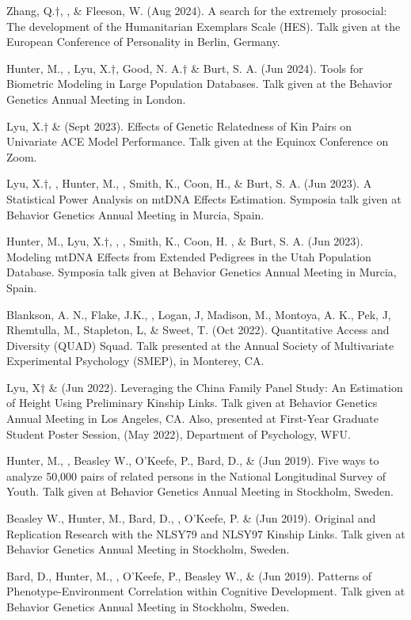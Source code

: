 \begin{etaremune}
\item Zhang, Q.$\dagger$, \meb, \&  Fleeson, W. (Aug 2024). A search for the extremely prosocial: The development of the Humanitarian Exemplars Scale (HES). Talk given at the European Conference of Personality in Berlin, Germany.
\item Hunter, M., \meb, Lyu, X.$\dagger$, Good, N. A.$\dagger$ \& Burt, S. A. (Jun 2024). Tools for Biometric Modeling in Large Population Databases. Talk given at the Behavior Genetics Annual Meeting in London.
\item Lyu, X.$\dagger$ \& \meb (Sept 2023). Effects of Genetic Relatedness of Kin Pairs on Univariate ACE Model Performance. Talk given at the Equinox Conference on Zoom.
\item Lyu, X.$\dagger$, \meb, Hunter, M.,  \Joe, Smith, K., Coon, H., \& Burt, S. A. (Jun 2023). A Statistical Power Analysis on mtDNA Effects Estimation. Symposia talk given at Behavior Genetics Annual Meeting in Murcia, Spain.
\item Hunter, M., Lyu, X.$\dagger$, \meb,  \Joe, Smith, K., Coon, H. , \& Burt, S. A. (Jun 2023). Modeling mtDNA Effects from Extended Pedigrees in the Utah Population Database. Symposia talk given at Behavior Genetics Annual Meeting in Murcia, Spain.
\item  Blankson, A. N., Flake, J.K., \meb, Logan, J, Madison, M., Montoya, A. K., Pek, J, Rhemtulla, M., Stapleton, L, \& Sweet, T. (Oct 2022). Quantitative Access and Diversity (QUAD) Squad. Talk presented at the Annual Society of Multivariate Experimental Psychology (SMEP), in Monterey, CA.
\item Lyu, X$\dagger$ \& \meb (Jun 2022). Leveraging the China Family Panel Study: An Estimation of Height Using Preliminary Kinship Links. Talk given at Behavior Genetics Annual Meeting in Los Angeles, CA. Also, presented at First-Year Graduate Student Poster Session, (May 2022), Department of Psychology, WFU. 
%
\item Hunter, M., \meb, Beasley W., O'Keefe, P.,  Bard, D., \& \Joe (Jun 2019). Five ways to analyze 50,000 pairs of related persons in the National Longitudinal Survey of Youth. Talk given at Behavior Genetics Annual Meeting in Stockholm, Sweden. 
%
\item Beasley W., Hunter, M., Bard, D., \meb, O'Keefe, P. \&  \Joe (Jun 2019). Original and Replication Research with the NLSY79 and NLSY97 Kinship Links. Talk given at Behavior Genetics Annual Meeting in Stockholm, Sweden. 
%
\item Bard, D., Hunter, M., \meb, O'Keefe, P., Beasley W.,  \&  \Joe (Jun 2019). Patterns of Phenotype-Environment Correlation within Cognitive Development. Talk given at Behavior Genetics Annual Meeting in Stockholm, Sweden. 

\end{etaremune}
